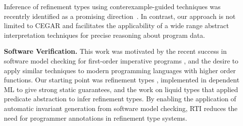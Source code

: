 \documentclass[nocopyrightspace]{sigplanconf}
\def\mypara#1{\smallskip\noindent\textbf{#1}}
\newcommand\HMC{\textsc{RTI}\xspace}
\begin{document}
Inference of refinement types using conterexample-guided techniques
was recentrly identified as a promising
direction~\cite{UnnoPPDP09,TerauchiPOPL2010}.
In contrast, our approach is not limited to CEGAR and facilitates the
applicability of a wide range abstract interpretation techniques for
precise reasoning about program data.

\mypara{Software Verification.}
This work was motivated by the recent success in 
software model checking for first-order imperative
programs \cite{SLAMPOPL02,HJMM04,CousotPLDI03,McMillan06}, 
and the desire to apply similar techniques to modern programming
languages with higher order functions.
Our starting point was refinement types \cite{FreemanPfenning91,Knowles07},
implemented in dependent ML \cite{XiPfenning99} to give strong static guarantees, 
and the work on liquid types \cite{LiquidPLDI08,LiquidPLDI09}
that applied predicate abstraction to infer refinement types.
By enabling the application of automatic invariant generation from software
model checking,
\HMC reduces the need for programmer annotations in refinement type systems.




\end{document}
